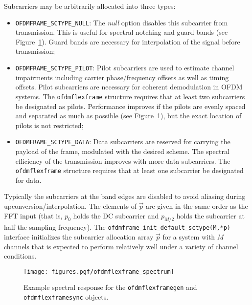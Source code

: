 Subcarriers may be arbitrarily allocated into three types:
\begin{itemize}
\item {\tt OFDMFRAME\_SCTYPE\_NULL}:
      The {\em null} option disables this subcarrier from transmission.
      This is useful for
      spectral notching and
      guard bands
      (see Figure~\ref{fig:module:framing:ofdmflexframe_spectrum}).
      Guard bands are necessary for interpolation of the signal before
      transmission;
\item {\tt OFDMFRAME\_SCTYPE\_PILOT}:
      Pilot subcarriers are used to estimate channel impairments
      including carrier phase/frequency offsets as well as timing
      offsets.
      Pilot subcarriers are necessary for coherent demodulation in OFDM
      systems.
      The {\tt ofdmflexframe} structure requires that at least two
      subcarriers be designated as pilots.
      Performance improves if the pilots are evenly spaced and separated
      as much as possible
      (see Figure~\ref{fig:module:framing:ofdmflexframe_spectrum}),
      but the exact location of pilots is not restricted;
\item {\tt OFDMFRAME\_SCTYPE\_DATA}:
      Data subcarriers are reserved for carrying the payload of the
      frame, modulated with the desired scheme.
      The spectral efficiency of the transmission improves with more
      data subcarriers.
      The {\tt ofdmflexframe} structure requires that at least one
      subcarrier be designated for data.
\end{itemize}
%
Typically the subcarriers at the band edges are disabled to avoid
aliasing during upconversion/interpolation.
%
The elements of $\vec{p}$ are given in the same order as the FFT input
(that is, $p_0$ holds the DC subcarrier and $p_{M/2}$ holds the
subcarrier at half the sampling frequency).
%
The {\tt ofdmframe\_init\_default\_sctype(M,*p)} interface
initializes the subcarrier allocation array $\vec{p}$
for a system with $M$ channels that is expected to perform relatively
well under a variety of channel conditions.
% 
%
\begin{figure}
\centering
  \texttt{[image: figures.pgf/ofdmflexframe\_spectrum]}
\caption{
    Example spectral response for the
    {\tt ofdmflexframegen} and
    {\tt ofdmflexframesync} objects.}
\label{fig:module:framing:ofdmflexframe_spectrum}
\end{figure}
